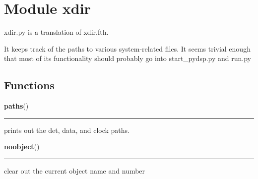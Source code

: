 %
%
%


\section{Module xdir}

    \label{xdir}
xdir.py is a translation of xdir.fth.

It keeps track of the paths to various system-related files. It seems 
trivial enough that most of its functionality should probably go into 
start\_pydsp.py and run.py



  \subsection{Functions}

    \label{xdir:paths}

    \vspace{0.5ex}

    \begin{boxedminipage}{\textwidth}

    \raggedright \textbf{paths}()

    \vspace{-1.5ex}

    \rule{\textwidth}{0.5\fboxrule}
    prints out the det, data, and clock paths.

    \vspace{1ex}

    \end{boxedminipage}

    \label{xdir:noobject}

    \vspace{0.5ex}

    \begin{boxedminipage}{\textwidth}

    \raggedright \textbf{noobject}()

    \vspace{-1.5ex}

    \rule{\textwidth}{0.5\fboxrule}
    clear out the current object name and number

    \vspace{1ex}

    \end{boxedminipage}

